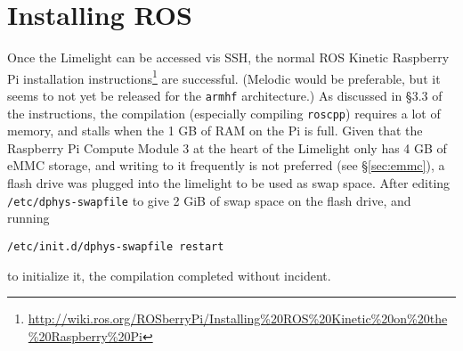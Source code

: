 \documentclass{article}
\begin{document}
\section{Installing ROS}
Once the Limelight can be accessed vis SSH, the normal ROS Kinetic Raspberry Pi installation instructions\footnote{\url{http://wiki.ros.org/ROSberryPi/Installing\%20ROS\%20Kinetic\%20on\%20the\%20Raspberry\%20Pi}} are successful. (Melodic would be preferable, but it seems to not yet be released for the \texttt{armhf} architecture.) As discussed in \S 3.3 of the instructions, the compilation (especially compiling \texttt{roscpp}) requires a lot of memory, and stalls when the 1 GB of RAM on the Pi is full. Given that the Raspberry Pi Compute Module 3 at the heart of the Limelight only has 4 GB of eMMC storage, and writing to it frequently is not preferred (see \S\ref{sec:emmc}), a flash drive was plugged into the limelight to be used as swap space. After editing \texttt{/etc/dphys-swapfile} to give 2 GiB of swap space on the flash drive, and running 
\begin{verbatim}
/etc/init.d/dphys-swapfile restart
\end{verbatim}
to initialize it, the compilation completed without incident. 
\end{document}
